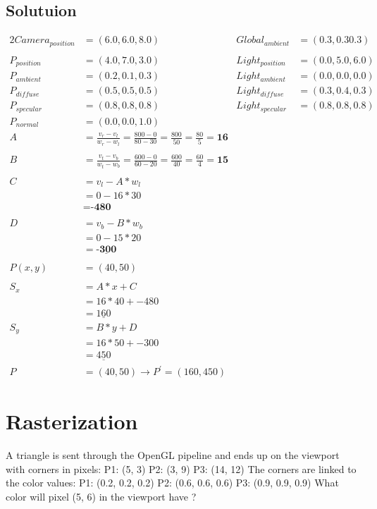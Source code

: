 \documentclass[12pt,fleqn,reqno]{article}
\begin{document}
\subsection{Solutuion}
\begin{alignat*}{2}
	Camera_{position}	&= (6.0, 6.0, 8.0)
	&Global_{ambient}	&= (0.3, 0.3 0.3) \\
	\\
	P_{position}		&=  (4.0, 7.0, 3.0)
	&Light_{position}	&= (0.0, 5.0, 6.0)\\
	P_{ambient}		&= (0.2, 0.1, 0.3)
	&Light_{ambient}	&= (0.0, 0.0, 0.0)\\
	P_{diffuse}		&= (0.5, 0.5, 0.5)
	&Light_{diffuse}	&= (0.3, 0.4, 0.3)\\
	P_{specular}		&= (0.8, 0.8, 0.8)
	&Light_{specular}	&= (0.8, 0.8,0.8)\\
	P_{normal}		&=  (0.0,0.0, 1.0)
\\
	A 	&= \frac{v_r - v_l} { w_r - w_l} = \frac{800 - 0} { 80 - 30} = \frac{800} { 50} = \frac{80} { 5} = \textbf{16}
		\\
		\\
	B 	&= \frac{v_t - v_b} { w_t - w_b} = \frac{600 - 0} { 60 - 20} = \frac{600} { 40} = \frac{60} { 4} = \textbf{15}
	\\
	\\
	C	&= v_l - A * w_l\\
		&= 0 -16 * 30\\
		&= \textbf{-480}\\
	\\
	D	&= v_b - B * w_b\\
		&= 0 - 15 * 20\\
		&=\underline{\textbf{-300}}\\
	\\
	P(x,y) &= (40,50)
	\\
	\\
	S_x	&= A * x + C\\
		&= 16 * 40 + -480\\
		&= \underline{160}
	\\
	S_y	&= B * y + D\\
		&= 16 * 50 + -300\\
		&= \underline{450}
	\\
	P	&= (40,50) \to P^{'} = (160,450)
\end{alignat*}

\section{Rasterization}
A triangle is sent through the OpenGL pipeline and ends up on the viewport with corners in pixels:
P1: (5, 3)
P2: (3, 9)
P3: (14, 12)
The corners are linked to the color values:
P1: (0.2, 0.2, 0.2)
P2: (0.6, 0.6, 0.6)
P3: (0.9, 0.9, 0.9)
What color will pixel (5, 6) in the viewport have ?
\end{document}
